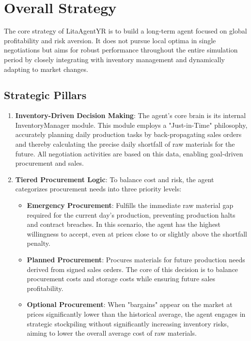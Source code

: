 \documentclass[12pt, a4paper]{article}
\begin{document}
\section{Overall Strategy}
The core strategy of LitaAgentYR is to build a long-term agent focused on global profitability and risk aversion. It does not pursue local optima in single negotiations but aims for robust performance throughout the entire simulation period by closely integrating with inventory management and dynamically adapting to market changes.

\subsection{Strategic Pillars}
\begin{enumerate}
\item \textbf{Inventory-Driven Decision Making}: The agent's core brain is its internal InventoryManager module. This module employs a "Just-in-Time" philosophy, accurately planning daily production tasks by back-propagating sales orders and thereby calculating the precise daily shortfall of raw materials for the future. All negotiation activities are based on this data, enabling goal-driven procurement and sales.

\item \textbf{Tiered Procurement Logic}: To balance cost and risk, the agent categorizes procurement needs into three priority levels:
    \begin{itemize}
        \item \textbf{Emergency Procurement}: Fulfills the immediate raw material gap required for the current day's production, preventing production halts and contract breaches. In this scenario, the agent has the highest willingness to accept, even at prices close to or slightly above the shortfall penalty.
        \item \textbf{Planned Procurement}: Procures materials for future production needs derived from signed sales orders. The core of this decision is to balance procurement costs and storage costs while ensuring future sales profitability.
        \item \textbf{Optional Procurement}: When "bargains" appear on the market at prices significantly lower than the historical average, the agent engages in strategic stockpiling without significantly increasing inventory risks, aiming to lower the overall average cost of raw materials.
    \end{itemize}


\end{enumerate}
\end{document}
